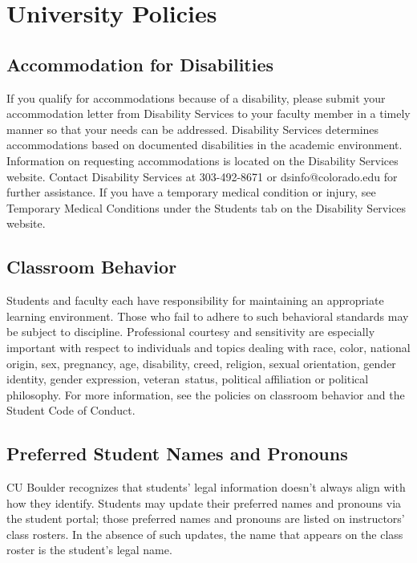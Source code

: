 \documentclass[9pt]{article}
\begin{document}
\section*{University Policies}

{\small


\subsection*{Accommodation for Disabilities}
If you qualify for accommodations because of a disability, please submit your accommodation letter from Disability Services to your faculty member in a timely manner so that your needs can be addressed.  Disability Services determines accommodations based on documented disabilities in the academic environment.  Information on requesting accommodations is located on the Disability Services website. Contact Disability Services at 303-492-8671 or dsinfo@colorado.edu for further assistance.  If you have a temporary medical condition or injury, see Temporary Medical Conditions under the Students tab on the Disability Services website.

\subsection*{Classroom Behavior}
Students and faculty each have responsibility for maintaining an appropriate learning environment. Those who fail to adhere to such behavioral standards may be subject to discipline. Professional courtesy and sensitivity are especially important with respect to individuals and topics dealing with race, color, national origin, sex, pregnancy, age, disability, creed, religion, sexual orientation, gender identity, gender expression, veteran status, political affiliation or political philosophy.  For more information, see the policies on classroom behavior and the Student Code of Conduct.
\subsection*{Preferred Student Names and Pronouns}
CU Boulder recognizes that students' legal information doesn't always align with how they identify. Students may update their preferred names and pronouns via the student portal; those preferred names and pronouns are listed on instructors' class rosters. In the absence of such updates, the name that appears on the class roster is the student's legal name.
}
\end{document}
